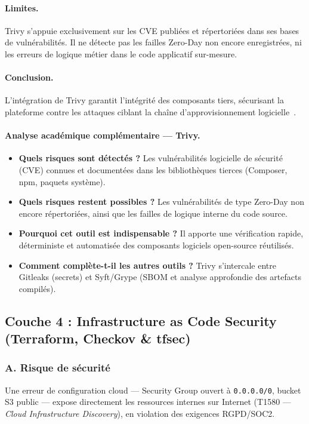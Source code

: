 \paragraph{Limites.}
Trivy s'appuie exclusivement sur les CVE publiées et répertoriées dans ses bases de vulnérabilités. Il ne détecte pas les failles Zero-Day non encore enregistrées, ni les erreurs de logique métier dans le code applicatif sur-mesure.

\paragraph{Conclusion.}
L'intégration de Trivy garantit l'intégrité des composants tiers, sécurisant la plateforme contre les attaques ciblant la chaîne d'approvisionnement logicielle~\cite{zahan_sca_study_2022}.

\paragraph{Analyse académique complémentaire — Trivy.}
\begin{itemize}
    \item \textbf{Quels risques sont détectés ?} Les vulnérabilités logicielle de sécurité (CVE) connues et documentées dans les bibliothèques tierces (Composer, npm, paquets système).
    \item \textbf{Quels risques restent possibles ?} Les vulnérabilités de type Zero-Day non encore répertoriées, ainsi que les failles de logique interne du code source.
    \item \textbf{Pourquoi cet outil est indispensable ?} Il apporte une vérification rapide, déterministe et automatisée des composants logiciels open-source réutilisés.
    \item \textbf{Comment complète-t-il les autres outils ?} Trivy s'intercale entre Gitleaks (secrets) et Syft/Grype (SBOM et analyse approfondie des artefacts compilés).
\end{itemize}

\subsection{Couche 4 : Infrastructure as Code Security (Terraform, Checkov \& tfsec)}

\subsubsection{A. Risque de sécurité}
Une erreur de configuration cloud — Security Group ouvert à \texttt{0.0.0.0/0}, bucket S3 public — expose directement les ressources internes sur Internet (T1580 — \textit{Cloud Infrastructure Discovery}), en violation des exigences RGPD/SOC2.

